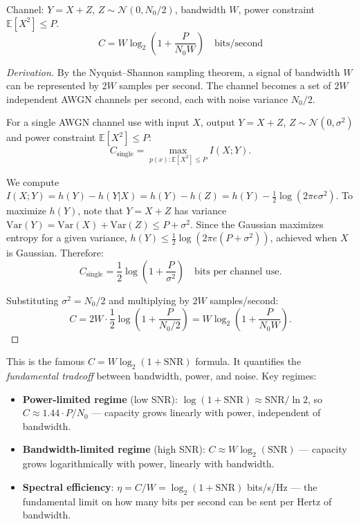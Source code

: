\begin{theorem}
Channel: $Y = X + Z$, $Z \sim \mathcal{N}(0, N_0/2)$, bandwidth $W$, power constraint $\mathbb{E}[X^2] \le P$.
\[
C = W \log_2 \left( 1 + \frac{P}{N_0 W} \right) \quad \text{bits/second}
\]
\end{theorem}

\begin{proof}[Derivation]
By the Nyquist--Shannon sampling theorem, a signal of bandwidth $W$ can be represented by $2W$ samples per second. The channel becomes a set of $2W$ independent AWGN channels per second, each with noise variance $N_0/2$.

For a single AWGN channel use with input $X$, output $Y = X+Z$, $Z \sim \mathcal{N}(0,\sigma^2)$ and power constraint $\mathbb{E}[X^2] \le P$:
\[
C_{\text{single}} = \max_{p(x):\mathbb{E}[X^2]\le P} I(X;Y).
\]

We compute $I(X;Y) = h(Y) - h(Y|X) = h(Y) - h(Z) = h(Y) - \frac{1}{2}\log(2\pi e \sigma^2)$.
To maximize $h(Y)$, note that $Y = X+Z$ has variance $\text{Var}(Y) = \text{Var}(X) + \text{Var}(Z) \le P + \sigma^2$. Since the Gaussian maximizes entropy for a given variance, $h(Y) \le \frac{1}{2}\log(2\pi e (P+\sigma^2))$, achieved when $X$ is Gaussian. Therefore:
\[
C_{\text{single}} = \frac{1}{2}\log\left(1 + \frac{P}{\sigma^2}\right) \quad \text{bits per channel use}.
\]

Substituting $\sigma^2 = N_0/2$ and multiplying by $2W$ samples/second:
\[
C = 2W \cdot \frac{1}{2} \log\left(1 + \frac{P}{N_0/2}\right) = W \log_2\left(1 + \frac{P}{N_0 W}\right).
\]
\end{proof}

This is the famous $C = W \log_2(1 + \text{SNR})$ formula. It quantifies the \emph{fundamental tradeoff} between bandwidth, power, and noise. Key regimes:

\begin{itemize}
\item \textbf{Power-limited regime} (low SNR): $\log(1+\text{SNR}) \approx \text{SNR}/\ln 2$, so $C \approx 1.44 \cdot P/N_0$ — capacity grows linearly with power, independent of bandwidth.
\item \textbf{Bandwidth-limited regime} (high SNR): $C \approx W \log_2(\text{SNR})$ — capacity grows logarithmically with power, linearly with bandwidth.
\item \textbf{Spectral efficiency}: $\eta = C/W = \log_2(1+\text{SNR})$ bits/s/Hz — the fundamental limit on how many bits per second can be sent per Hertz of bandwidth.
\end{itemize}

